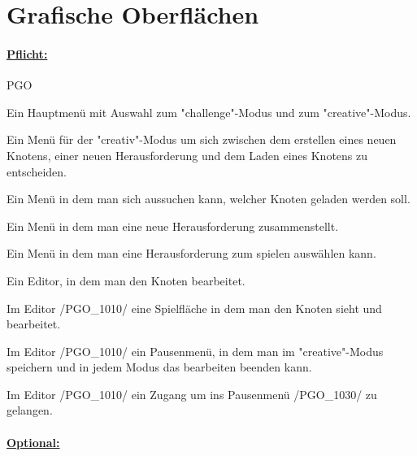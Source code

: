 %
%


%
%
\clearpage


\section{Grafische Oberflächen}
\label{NU:GO}

\paragraph*{\underline{Pflicht:}}

\begin{ids}{\gls{PGO}}

	\id[0010] Ein Hauptmenü mit Auswahl zum "challenge"-Modus und zum "creative"-Modus.
	
	\id[0020] Ein Menü für der "creativ"-Modus um sich zwischen dem erstellen eines neuen Knotens, einer neuen Herausforderung und dem Laden eines Knotens zu entscheiden.
	
	\id[0030] Ein Menü in dem man sich aussuchen kann, welcher Knoten geladen werden soll.
	
	\id[0040] Ein Menü in dem man eine neue Herausforderung zusammenstellt.
	
	\id[0050] Ein Menü in dem man eine Herausforderung zum spielen auswählen kann.
	
	\id[1010] Ein Editor, in dem man den Knoten bearbeitet.
	
	\id[1020] Im Editor /PGO\_1010/ eine Spielfläche in dem man den Knoten sieht und bearbeitet.
	
	\id[1030] Im Editor /PGO\_1010/ ein Pausenmenü, in dem man im "creative"-Modus speichern und in jedem Modus das bearbeiten beenden kann.
	
	\id[1040] Im Editor /PGO\_1010/ ein Zugang um ins Pausenmenü /PGO\_1030/ zu gelangen.

\end{ids}




\paragraph*{\underline{Optional:}}

